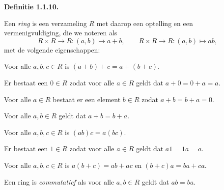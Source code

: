\documentclass[10pt,a4paper]{article}
\newenvironment{res}[1]{%
  \par\noindent\textbf{Definitie #1.}~\ignorespaces
}{%
  \par\vspace{2pt}\normalfont
}
\begin{document}
\begin{res}{1.1.10}
Een \textit{ring} is een verzameling $R$ met daarop een optelling en een vermenigvuldiging, die we noteren als
\[
R\times R\to R:(a,b)\mapsto a+b,\qquad R\times R\to R:(a,b)\mapsto ab,
\]
met de volgende eigenschappen:
\begin{description}[leftmargin=2.6em,itemsep=1pt,topsep=1pt,font=\normalfont\bfseries]
\item[(R1)] Voor alle $a,b,c\in R$ is $(a+b)+c=a+(b+c)$.
\item[(R2)] Er bestaat een $0\in R$ zodat voor alle $a\in R$ geldt dat $a+0=0+a=a$.
\item[(R3)] Voor alle $a\in R$ bestaat er een element $b\in R$ zodat $a+b=b+a=0$.
\item[(R4)] Voor alle $a,b\in R$ geldt dat $a+b=b+a$.
\item[(R5)] Voor alle $a,b,c\in R$ is $(ab)c=a(bc)$.
\item[(R6)] Er bestaat een $1\in R$ zodat voor alle $a\in R$ geldt dat $a1=1a=a$.
\item[(R7)] Voor alle $a,b,c\in R$ is $a(b+c)=ab+ac$ en $(b+c)a=ba+ca$.
\end{description}
Een ring is \textit{commutatief} als voor alle $a,b\in R$ geldt dat $ab=ba$.
\end{res}
\end{document}
